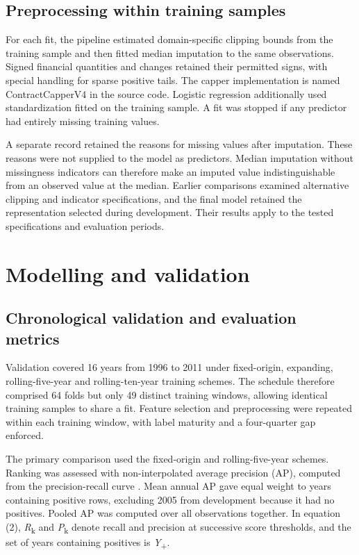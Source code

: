 \documentclass[11pt,a4paper]{article}
\begin{document}
\subsection{Preprocessing within training samples}
For each fit, the pipeline estimated domain-specific clipping bounds from the training sample and then fitted median imputation to the same observations. Signed financial quantities and changes retained their permitted signs, with special handling for sparse positive tails. The capper implementation is named ContractCapperV4 in the source code. Logistic regression additionally used standardization fitted on the training sample. A fit was stopped if any predictor had entirely missing training values.

A separate record retained the reasons for missing values after imputation. These reasons were not supplied to the model as predictors. Median imputation without missingness indicators can therefore make an imputed value indistinguishable from an observed value at the median. Earlier comparisons examined alternative clipping and indicator specifications, and the final model retained the representation selected during development. Their results apply to the tested specifications and evaluation periods.

\section{Modelling and validation}
\subsection{Chronological validation and evaluation metrics}
Validation covered 16 years from 1996 to 2011 under fixed-origin, expanding, rolling-five-year and rolling-ten-year training schemes. The schedule therefore comprised 64 folds but only 49 distinct training windows, allowing identical training samples to share a fit. Feature selection and preprocessing were repeated within each training window, with label maturity and a four-quarter gap enforced.

The primary comparison used the fixed-origin and rolling-five-year schemes. Ranking was assessed with non-interpolated average precision (AP), computed from the precision-recall curve \citep{sklearnap}. Mean annual AP gave equal weight to years containing positive rows, excluding 2005 from development because it had no positives. Pooled AP was computed over all observations together. In equation (2), \textit{R}\textsubscript{k} and \textit{P}\textsubscript{k} denote recall and precision at successive score thresholds, and the set of years containing positives is \textit{Y}\textsubscript{+}.
\end{document}
